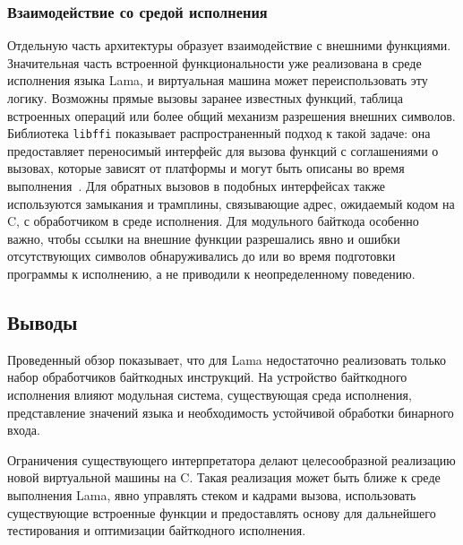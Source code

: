 \subsubsection{Взаимодействие со средой исполнения}
Отдельную часть архитектуры образует взаимодействие с внешними функциями.
Значительная часть встроенной функциональности уже реализована в среде
исполнения языка Lama, и виртуальная машина может переиспользовать эту логику.
Возможны прямые вызовы заранее известных функций, таблица встроенных операций
или более общий механизм разрешения внешних символов. Библиотека
\texttt{libffi} показывает распространенный подход к такой задаче: она
предоставляет переносимый интерфейс для вызова функций с соглашениями о
вызовах, которые зависят от платформы и могут быть описаны во время
выполнения~\cite{Libffi}. Для обратных вызовов в подобных интерфейсах также
используются замыкания и трамплины, связывающие адрес, ожидаемый кодом на C, с
обработчиком в среде исполнения. Для модульного байткода особенно важно, чтобы
ссылки на внешние функции разрешались явно и ошибки отсутствующих символов
обнаруживались до или во время подготовки программы к исполнению, а не
приводили к неопределенному поведению.


\subsection{Выводы}

Проведенный обзор показывает, что для Lama недостаточно реализовать только
набор обработчиков байткодных инструкций. На устройство байткодного исполнения
влияют модульная система, существующая среда исполнения, представление значений языка и
необходимость устойчивой обработки бинарного входа.

Ограничения существующего интерпретатора делают целесообразной
реализацию новой виртуальной машины на C. Такая реализация может быть ближе к
среде выполнения Lama, явно управлять стеком и кадрами вызова, использовать
существующие встроенные функции и предоставлять основу для дальнейшего
тестирования и оптимизации байткодного исполнения.
